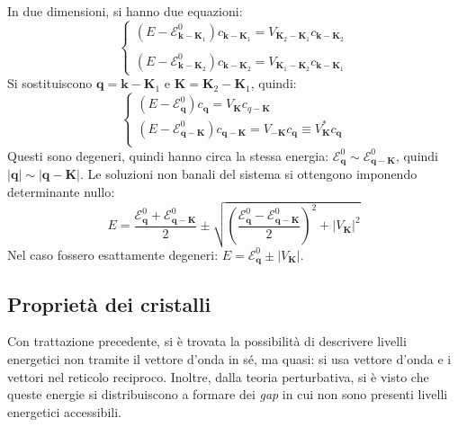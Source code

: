 \documentclass[10pt, a4paper]{scrartcl}
\numberwithin{equation}{subsection}
\theoremstyle{style1}
\theoremstyle{style2}
\begin{document}
In due dimensioni, si hanno due equazioni:
\[
\begin{cases}
	\displaystyle (E-\mathscr{E}^0_{\mathbf{k} - \mathbf{K} _1} )c_{\mathbf{k} -\mathbf{K} _1} = V_{\mathbf{K}_2 - \mathbf{K} _1} c_{\mathbf{k}-\mathbf{K}_2  } \\
	\\
	\displaystyle (E-\mathscr{E}^0_{\mathbf{k} - \mathbf{K} _2} )c_{\mathbf{k} -\mathbf{K} _2} = V_{\mathbf{K}_1 - \mathbf{K} _2} c_{\mathbf{k}-\mathbf{K}_1  } 
\end{cases}
\] 
Si sostituiscono $\mathbf{q} = \mathbf{k} -\mathbf{K} _1$ e $\mathbf{K} = \mathbf{K}_2 -\mathbf{K} _1$, quindi:
\begin{equation}
	\begin{cases}
		(E-\mathscr{E}^0_\mathbf{q} ) c_\mathbf{q}  = V_\mathbf{K} c_{q - \mathbf{K} } \\
		(E-\mathscr{E}^0_\mathbf{q-\mathbf{K} } ) c_\mathbf{q-\mathbf{K} }  = V_\mathbf{-K} c_{\mathbf{q} }\equiv V^*_\mathbf{K} c_\mathbf{q}  \\
	\end{cases}
\end{equation}
Questi sono degeneri, quindi hanno circa la stessa energia: $\mathscr{E}^0_{\mathbf{q} } \sim \mathscr{E}^0_{\mathbf{q} -\mathbf{K} } $, quindi $\lvert \mathbf{q}  \rvert \sim \lvert \mathbf{q} -\mathbf{K}  \rvert $. Le soluzioni non banali del sistema si ottengono imponendo determinante nullo:
\begin{equation}
	E = \frac{\mathscr{E}^0 _\mathbf{q}  + \mathscr{E}^0_{\mathbf{q- \mathbf{K} } } }{2} \pm \sqrt{\left(\frac{\mathscr{E}^0_\mathbf{q} - \mathscr{E}^0_{\mathbf{q} - \mathbf{K} } }{2}\right) ^2 + \lvert V_\mathbf{K}  \rvert ^2} 
\end{equation}
Nel caso fossero esattamente degeneri: $E  = \mathscr{E}^0_\mathbf{q} \pm \lvert V_\mathbf{K}  \rvert $.
\subsection{Propriet\`a dei cristalli}
Con trattazione precedente, si \`e trovata la possibilit\`a di descrivere livelli energetici non tramite il vettore d'onda in s\'e, ma quasi: si usa vettore d'onda e i vettori nel reticolo reciproco. Inoltre, dalla teoria perturbativa, si \`e visto che queste energie si distribuiscono a formare dei \textit{gap} in cui non sono presenti livelli energetici accessibili.
\end{document}
